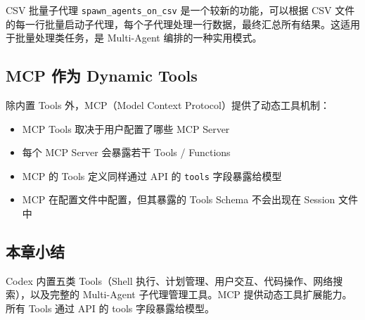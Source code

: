 \begin{knowledgebox}{CSV 批量子代理}
\texttt{spawn\_agents\_on\_csv} 是一个较新的功能，可以根据 CSV 文件的每一行批量启动子代理，每个子代理处理一行数据，最终汇总所有结果。这适用于批量处理类任务，是 Multi-Agent 编排的一种实用模式。
\end{knowledgebox}

\subsection{MCP 作为 Dynamic Tools}

除内置 Tools 外，MCP（Model Context Protocol）提供了动态工具机制：

\begin{itemize}
    \item MCP Tools 取决于用户配置了哪些 MCP Server
    \item 每个 MCP Server 会暴露若干 Tools / Functions
    \item MCP 的 Tools 定义同样通过 API 的 \texttt{tools} 字段暴露给模型
    \item MCP 在配置文件中配置，但其暴露的 Tools Schema 不会出现在 Session 文件中
\end{itemize}

\subsection{本章小结}

Codex 内置五类 Tools（Shell 执行、计划管理、用户交互、代码操作、网络搜索），以及完整的 Multi-Agent 子代理管理工具。MCP 提供动态工具扩展能力。所有 Tools 通过 API 的 tools 字段暴露给模型。


